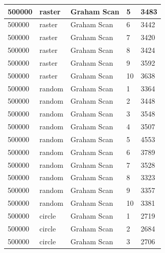\documentclass[12pt]{article}
\begin{document}
\begin{longtable}{|l|l|l|l|l|}
500000       & raster            & Graham Scan & 5          & 3483                          \\ \hline
500000       & raster            & Graham Scan & 6          & 3442                          \\ \hline
500000       & raster            & Graham Scan & 7          & 3420                          \\ \hline
500000       & raster            & Graham Scan & 8          & 3424                          \\ \hline
500000       & raster            & Graham Scan & 9          & 3592                          \\ \hline
500000       & raster            & Graham Scan & 10         & 3638                          \\ \hline
500000       & random            & Graham Scan & 1          & 3364                          \\ \hline
500000       & random            & Graham Scan & 2          & 3448                          \\ \hline
500000       & random            & Graham Scan & 3          & 3548                          \\ \hline
500000       & random            & Graham Scan & 4          & 3507                          \\ \hline
500000       & random            & Graham Scan & 5          & 4553                          \\ \hline
500000       & random            & Graham Scan & 6          & 3789                          \\ \hline
500000       & random            & Graham Scan & 7          & 3528                          \\ \hline
500000       & random            & Graham Scan & 8          & 3323                          \\ \hline
500000       & random            & Graham Scan & 9          & 3357                          \\ \hline
500000       & random            & Graham Scan & 10         & 3381                          \\ \hline
500000       & circle            & Graham Scan & 1          & 2719                          \\ \hline
500000       & circle            & Graham Scan & 2          & 2684                          \\ \hline
500000       & circle            & Graham Scan & 3          & 2706                          \\ \hline

\end{longtable}
\end{document}

